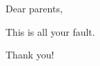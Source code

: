 \chapter*{}

\mbox{}\vfill

\begin{center}
	\hspace{-25 mm} Dear parents,

	This is all your fault.

	\hspace{25 mm} Thank you!
\end{center}

\vfill
\vfill
\vfill
